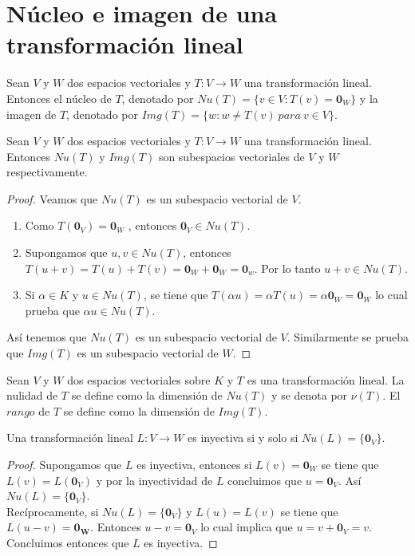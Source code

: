 \section{Núcleo e imagen de una transformación lineal}
\begin{dfn}
Sean $V$ y $W$ dos espacios vectoriales y $T : V \to W$ una transformación lineal. Entonces el núcleo de $T$, denotado por $Nu(T) = \{v \in V : T(v) = \mathbf{0}_W\}$ y la imagen de $T$, denotado por $Img(T) = \{w : w \neq T(v) \ para \ v \in V\}$.
\end{dfn}

\begin{theorem}
Sean $V$ y $W$ dos espacios vectoriales y $T : V \to W$ una transformación lineal. Entonces $Nu(T)$ y $Img(T)$ son subespacios vectoriales de $V$ y $W$ respectivamente.
\end{theorem}

\begin{proof}
Veamos que $Nu(T)$ es un subespacio vectorial de $V$.
\begin{enumerate}
\item Como $T(\mathbf{0}_V)=\mathbf{0}_W$ , entonces $\mathbf{0}_V \in Nu(T)$.
\item Supongamos que $u , v \in Nu(T)$, entonces $T(u+v) = T(u) + T(v) = \mathbf{0}_W + \mathbf{0}_W = \mathbf{0}_w$. Por lo tanto $u+v \in Nu(T)$.
\item Si $\alpha \in K$ y $u \in Nu(T)$, se tiene que $T(\alpha u) = \alpha T(u) = \alpha \mathbf{0}_W = \mathbf{0}_W$ lo cual prueba que $\alpha u \in Nu(T)$.
\end{enumerate}
Así tenemos que $Nu(T)$ es un subespacio vectorial de $V$. Similarmente se prueba que $Img(T)$ es un subespacio vectorial de $W$.
\end{proof}

\begin{dfn}
Sean $V$ y $W$ dos espacios vectoriales sobre $K$ y $T$ es una transformación lineal. La nulidad de $T$ se define como la dimensión de $Nu(T)$ y se denota por $\nu (T)$. El $rango$ de $T$ se define como la dimensión de $Img(T)$.
\end{dfn}

\begin{theorem}
Una transformación lineal $L : V \to W$ es inyectiva si y solo si $Nu(L) = \{\mathbf{0}_V\}$.
\end{theorem}

\begin{proof}
Supongamos que $L$ es inyectiva, entonces si $L(v) = \mathbf{0}_W$ se tiene que $L(v) = L(\mathbf{0}_V)$ y por la inyectividad de $L$ concluimos que $u = \mathbf{0}_V$. Así $Nu(L) = \{\mathbf{0}_V\}$.\\
Recíprocamente, si $Nu(L) = \{\mathbf{0}_V\}$ y $L(u) = L(v)$ se tiene que $L(u - v) = \mathbf{0_W}$. Entonces $u -v = \mathbf{0}_V$ lo cual implica que $u = v + \mathbf{0}_V = v$. Concluimos entonces que $L$ es inyectiva.
\end{proof}


